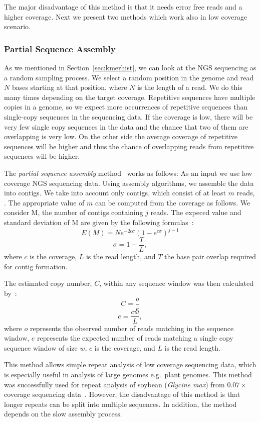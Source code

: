 The major disadvantage of this method is that it needs error free reads and a higher coverage.
Next we present two methods which work also in low coverage scenario.

\subsubsection{Partial Sequence Assembly}

As we mentioned in Section~\ref{sec:kmerhist}, we can look at the NGS sequencing as a random sampling process. We select a random position in the genome and read $N$ bases starting at that position, where $N$ is the length of a read. We do this many times depending on the target coverage.
Repetitive sequences have multiple copies in a genome, so we expect more occurrences of repetitive sequences than single-copy sequences in the sequencing data. If the coverage is low, there will be very few single copy sequences in the data and the chance that two of them are overlapping is very low. On the other side the average coverage of repetitive sequences will be higher and thus the chance of overlapping reads from repetitive sequences will be higher.

The \emph{partial sequence assembly} method~\cite{swaminathan2007global} works as follows: As an input we use low coverage NGS sequencing data. Using assembly algorithms, we assemble the data into contigs. We take into account only contigs, which consist of at least $m$ reads, . The appropriate value of $m$ can be computed from the coverage as follows. We consider M, the number of contigs containing $j$ reads. The expeced value and standard deviation of M are given by the following formulas~\cite{swaminathan2007global}:
$$E(M) = Ne^{-2c\sigma}{(1-e^{c\sigma})}^{j-1}$$
$$\sigma = 1 - \frac{T}{L},$$
where $c$ is the coverage, $L$ is the read length, and $T$ the base pair overlap required for contig formation.

The estimated copy number, $C$, within any sequence window was then calculated by~\cite{swaminathan2007global}:
$$C = \frac{o}{e}$$
$$e = \frac{cw}{L},$$
where $o$ represents the observed number of reads matching in the sequence window, $e$ represents the expected number of reads matching a single copy sequence window of size $w$, $c$ is the coverage, and $L$ is the read length.

This method allows simple repeat analysis of low coverage sequencing data, which is especially useful in analysis of large genomes e.g.\ plant genomes. This method was successfully used for repeat analysis of soybean (\textit{Glycine max}) from $0.07\times$ coverage sequencing data~\cite{swaminathan2007global}.
However, the disadvantage of this method is that longer repeats can be split into multiple sequences. In addition, the method depends on the slow assembly process.

